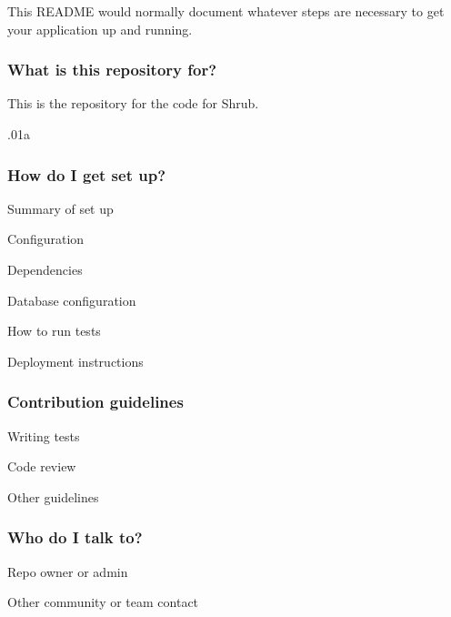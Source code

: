 This R\+E\+A\+D\+ME would normally document whatever steps are necessary to get your application up and running.

\subsubsection*{What is this repository for?}


\begin{DoxyItemize}
\item This is the repository for the code for Shrub.
\item .01a
\end{DoxyItemize}

\subsubsection*{How do I get set up?}


\begin{DoxyItemize}
\item Summary of set up
\item Configuration
\item Dependencies
\item Database configuration
\item How to run tests
\item Deployment instructions
\end{DoxyItemize}

\subsubsection*{Contribution guidelines}


\begin{DoxyItemize}
\item Writing tests
\item Code review
\item Other guidelines
\end{DoxyItemize}

\subsubsection*{Who do I talk to?}


\begin{DoxyItemize}
\item Repo owner or admin
\item Other community or team contact 
\end{DoxyItemize}